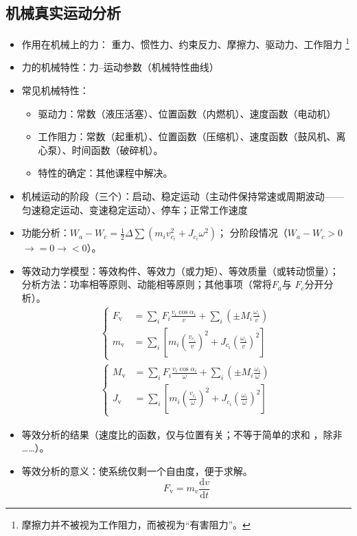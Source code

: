 \documentclass[12pt,a4paper]{article}
\newcommand{\tightlist}{\setlength{\parskip}{0pt}\setlength{\itemsep}{0pt}}
\newcommand{\hint}[1]{\textsf{（#1）}}
\newcommand{\minor}[1]{{\color{gray} #1}}
\newcommand{\then}{$\to$}
\begin{document}
\subsection{机械真实运动分析}
\begin{itemize}\tightlist
    \item 作用在机械上的力：\minor{重力、惯性力、约束反力、摩擦力、}驱动力、工作阻力
    \footnote{摩擦力并不被视为工作阻力，而被视为“有害阻力”。}
    \item 力的机械特性：力--运动参数\hint{机械特性曲线}
    \item 常见机械特性：
    \begin{itemize}\tightlist
        \item 驱动力：常数\hint{液压活塞}、位置函数\hint{内燃机}、速度函数\hint{电动机}
        \item 工作阻力：常数\hint{起重机}、位置函数\hint{压缩机}、速度函数\hint%
        {鼓风机、离心泵}、时间函数\hint{破碎机}。
        \item \minor{特性的确定：其他课程中解决。}
    \end{itemize}
    \item 机械运动的阶段\hint{三个}：启动、稳定运动\hint{主动件保持常速或周期波动——
    匀速稳定运动、变速稳定运动}、停车；正常工作速度
    \item 功能分析：$W_a-W_c=\frac12\Delta\sum(m_iv_{c_i}^2+J_{c_i}\omega^2)$；
    分阶段情况\hint{$W_a-W_c>0$\then$=0$\then$<0$}。
    \item 等效动力学模型：等效构件、等效力\hint{或力矩}、等效质量\hint{或转动惯量}；
    分析方法：功率相等原则、动能相等原则；其他事项\hint{常将$F_a$与
    $F_c$分开分析}。
    \begin{gather}
    \left\{
    \begin{aligned}
    F_\text{v}&=\sum_iF_i\frac{v_i\cos\alpha_i}{v}+\sum_i\left(\pm M_i\frac%
    {\omega_i}{v}\right)\\
    m_\text{v}&=\sum_i\left[m_i\left(\frac{v_{c_i}}{v}\right)^2+J_{c_i}\left(
    \frac{\omega_i}{v}\right)^2\right]
    \end{aligned}\right.\\\left\{
    \begin{aligned}
    M_\text{v}&=\sum_iF_i\frac{v_i\cos\alpha_i}{\omega}+\sum_i\left(\pm M_i
    \frac{\omega_i}{\omega}\right)\\
    J_\text{v}&=\sum_i\left[m_i\left(\frac{v_{c_i}}{\omega}\right)^2+J_{c_i}\left(
    \frac{\omega_i}{\omega}\right)^2\right]
    \end{aligned}\right.
    \end{gather}
    \item 等效分析的结果\hint{速度比的函数，仅与位置有关；不等于简单的求和\minor{，除非
    ……}}。
    \item 等效分析的意义：使系统仅剩一个自由度，便于求解。
    \begin{equation}
    F_\text{v}=m_v\frac{\mathrm{d}v}{\mathrm{d}t}
    \end{equation}
\end{itemize}
\end{document}

